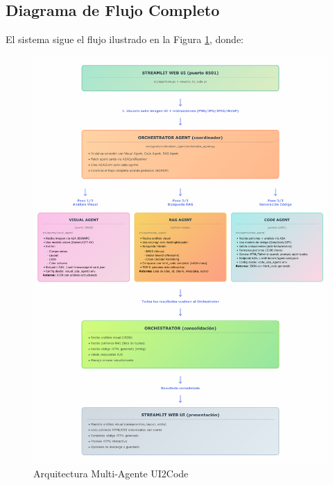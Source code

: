 \documentclass[12pt,a4paper]{article}
\begin{document}
\subsection{Diagrama de Flujo Completo}

El sistema sigue el flujo ilustrado en la Figura \ref{fig:arquitectura}, donde:

\begin{figure}[H]
\centering
\includegraphics[width=\textwidth]{../docs/diagrama-flujo-arquitectura-multi-agente.png}
\caption{Arquitectura Multi-Agente UI2Code}
\label{fig:arquitectura}
\end{figure}
\end{document}

